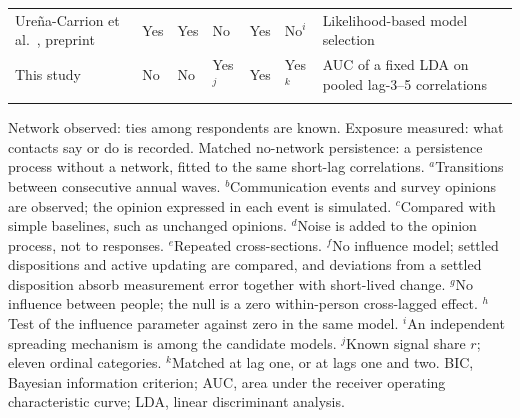 \begin{table}[tp]
\begin{center}
\begin{threeparttable}
\begin{tabular}{@{}p{}lllllp{}@{}}
\raggedright Ure\~{n}a-Carrion et al.\ \cite{urena2026}, preprint & Yes & Yes & No & Yes & No$^{i}$ & \raggedright Likelihood-based model selection\tabularnewline
\raggedright This study & No & No & Yes$^{j}$ & Yes & Yes$^{k}$ & \raggedright AUC of a fixed LDA on pooled lag-3--5 correlations\tabularnewline
\botrule
\end{tabular}
\par\vskip3pt\tablefootnotefont Network observed: ties among respondents are known. Exposure measured: what contacts say or do is recorded. Matched no-network persistence: a persistence process without a network, fitted to the same short-lag correlations. $^{a}$Transitions between consecutive annual waves. $^{b}$Communication events and survey opinions are observed; the opinion expressed in each event is simulated. $^{c}$Compared with simple baselines, such as unchanged opinions. $^{d}$Noise is added to the opinion process, not to responses. $^{e}$Repeated cross-sections. $^{f}$No influence model; settled dispositions and active updating are compared, and deviations from a settled disposition absorb measurement error together with short-lived change. $^{g}$No influence between people; the null is a zero within-person cross-lagged effect. $^{h}$Test of the influence parameter against zero in the same model. $^{i}$An independent spreading mechanism is among the candidate models. $^{j}$Known signal share $r$; eleven ordinal categories. $^{k}$Matched at lag one, or at lags one and two. BIC, Bayesian information criterion; AUC, area under the receiver operating characteristic curve; LDA, linear discriminant analysis.\par
\end{threeparttable}
\end{center}
\end{table}
